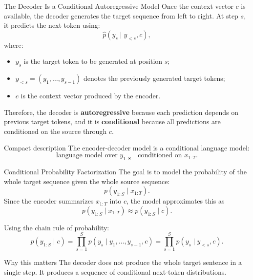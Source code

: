 \documentclass[aspectratio=169]{beamer}
\begin{document}
%
%
\begin{frame}{The Decoder Is a Conditional Autoregressive Model}
\small
Once the context vector $c$ is available, the decoder generates the target sequence from left to right.
At step $s$, it predicts the next token using:
\[
  \hat{p}(y_s \mid y_{<s}, c),
\]
where:
\begin{itemize}
  \item $y_s$ is the target token to be generated at position $s$;
  \item $y_{<s} = (y_1,\ldots,y_{s-1})$ denotes the previously generated target tokens;
  \item $c$ is the context vector produced by the encoder.
\end{itemize}

\vspace{0.15cm}
Therefore, the decoder is \textbf{autoregressive} because each prediction depends on previous target tokens,
and it is \textbf{conditional} because all predictions are conditioned on the source through $c$.

\begin{alertblock}{Compact description}
The encoder-decoder model is a conditional language model:
\[
  \text{language model over } y_{1:S} \quad \text{conditioned on } x_{1:T}.
\]
\end{alertblock}
\end{frame}
%
%
\begin{frame}{Conditional Probability Factorization}
\small
The goal is to model the probability of the whole target sequence given the whole source sequence:
\[
  p(y_{1:S} \mid x_{1:T}).
\]
Since the encoder summarizes $x_{1:T}$ into $c$, the model approximates this as
\[
  p(y_{1:S} \mid x_{1:T}) \approx p(y_{1:S} \mid c).
\]

\vspace{0.2cm}
Using the chain rule of probability:
\[
  p(y_{1:S} \mid c)
  = \prod_{s=1}^{S} p(y_s \mid y_1,\ldots,y_{s-1}, c)
  = \prod_{s=1}^{S} p(y_s \mid y_{<s}, c).
\]

\begin{block}{Why this matters}
The decoder does not produce the whole target sentence in a single step. It produces a sequence of conditional next-token distributions.
\end{block}
\end{frame}
%
\end{document}
